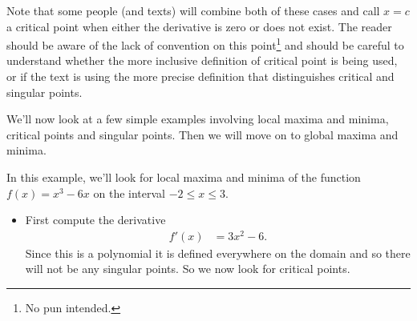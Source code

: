 \begin{warning}
Note that some people (and texts) will combine both of these cases and call
$x=c$ a critical point when either the derivative is zero or does not exist.
The reader should be aware of the lack of convention on this point\footnote{No
pun intended.} and should be careful to understand whether the more inclusive
definition of critical point is being used, or if the text is using the more
precise definition that distinguishes critical and singular points.
\end{warning}



We'll now look at a few simple examples involving local maxima and
minima, critical points and singular points. Then we will move on to global
maxima and minima.
\begin{eg}\label{eg:localMinMaxA}
In this example, we'll look for local maxima and minima of the function
$f(x) = x^3-6x$ on the interval $-2\le x\le 3$.
\begin{itemize}
 \item First compute the derivative
\begin{align*}
  f'(x) &= 3x^2-6.
\end{align*}
Since this is a polynomial it is defined everywhere on the domain and so there
will not be any singular points. So we now look for critical points.


\end{itemize}
\end{eg}
